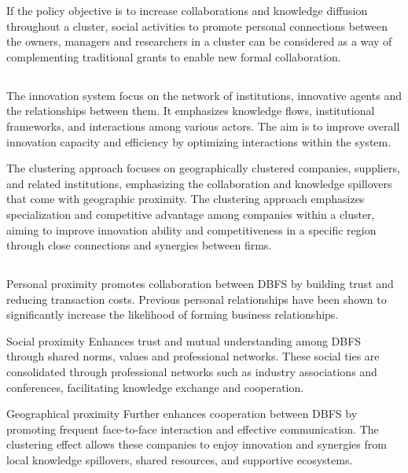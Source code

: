 \documentclass[UTF8,a4paper,AutoFakeBold,AutoFakeSlant]{article}
\begin{document}
If the policy objective is to increase collaborations and 
knowledge diffusion throughout a cluster, social activities to promote personal connections 
between the owners, managers and researchers in a cluster can be considered as a way of 
complementing traditional grants to enable new formal collaboration.


\subsection{}

The innovation system focus on the network of  institutions, innovative agents 
and the relationships between them. It emphasizes knowledge flows, institutional frameworks, and interactions among various actors. The aim is to improve overall innovation capacity and efficiency by optimizing interactions within the system.

The clustering approach focuses on geographically clustered companies, suppliers, and related institutions, emphasizing the collaboration and knowledge spillovers that come with geographic proximity. The clustering approach emphasizes specialization and competitive advantage among companies within a cluster, aiming to improve innovation ability and competitiveness in a specific region through close connections and synergies between firms.


\subsection{}

Personal proximity promotes collaboration between DBFS by building trust and reducing transaction costs. Previous personal relationships have been shown to significantly increase the likelihood of forming business relationships.

Social proximity Enhances trust and mutual understanding among DBFS through shared norms, values and professional networks. These social ties are consolidated through professional networks such as industry associations and conferences, facilitating knowledge exchange and cooperation.

Geographical proximity Further enhances cooperation between DBFS by promoting frequent face-to-face interaction and effective communication. The clustering effect allows these companies to enjoy innovation and synergies from local knowledge spillovers, shared resources, and supportive ecosystems.
\end{document}
